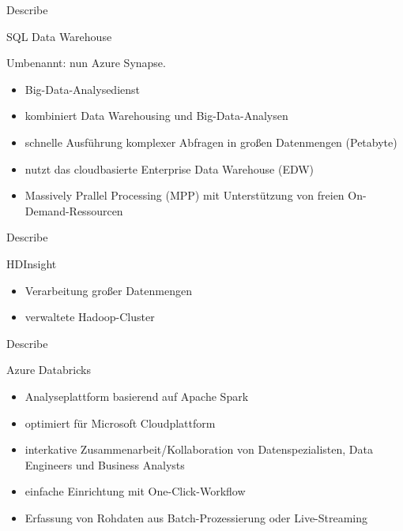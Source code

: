 \documentclass{scrartcl}
\newenvironment{flashcard}[2][]{%
    #1
    \vfill
    \centerline{\Large{#2}}
    \vfill
\newpage
}
{\newpage}
\begin{document}
    \begin{flashcard}[Describe]{SQL Data Warehouse}
        Umbenannt: nun Azure Synapse.

        \begin{itemize}
            \item Big-Data-Analysedienst
            \item kombiniert Data Warehousing und Big-Data-Analysen
            \item schnelle Ausführung komplexer Abfragen in großen Datenmengen (Petabyte)
            \item nutzt das cloudbasierte Enterprise Data Warehouse (EDW)
            \item Massively Prallel Processing (MPP) mit Unterstützung von freien On-Demand-Ressourcen
        \end{itemize}
    \end{flashcard}

    \begin{flashcard}[Describe]{HDInsight}
        \begin{itemize}
            \item Verarbeitung großer Datenmengen
            \item verwaltete Hadoop-Cluster
        \end{itemize}
    \end{flashcard}

    \begin{flashcard}[Describe]{Azure Databricks}
        \begin{itemize}
            \item Analyseplattform basierend auf Apache Spark
            \item optimiert für Microsoft Cloudplattform
            \item interkative Zusammenarbeit/Kollaboration von Datenspezialisten, Data Engineers und Business Analysts
            \item einfache Einrichtung mit One-Click-Workflow
            \item Erfassung von Rohdaten aus Batch-Prozessierung oder Live-Streaming
        \end{itemize}
    \end{flashcard}
\end{document}

